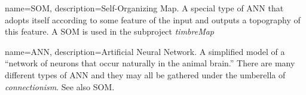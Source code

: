 {name={SOM},
  description={Self-Organizing Map. A special type of ANN that adopts itself according to some feature of the input and outputs a topography of this feature. A SOM is used in the subproject \emph{timbreMap}}}

{name={ANN},
  description={Artificial Neural Network. A simplified model of a ``network of neurons that occur naturally in the animal brain.'' \parencite[6]{gurney97} There are many different types of ANN and they may all be gathered under the umberella of \emph{connectionism}. See also SOM.}}

